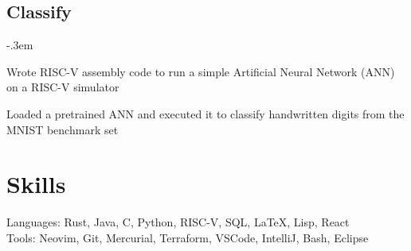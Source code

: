 \documentclass{article}
\let\olditemize=\itemize \let\endolditemize=\enditemize
\renewenvironment{itemize}{\olditemize[topsep=0em] \itemsep-.3em}{\endolditemize}
\begin{document}
\subsection{Classify}
\begin{itemize}
  \item Wrote RISC-V assembly code to run a simple Artificial Neural Network (ANN) on a RISC-V simulator
  \item Loaded a pretrained ANN and executed it to classify handwritten digits from the MNIST benchmark set
\end{itemize}




\section{Skills}
Languages:
  Rust, Java, C, Python, RISC-V, SQL, LaTeX, Lisp, React\\
Tools:
  Neovim, Git, Mercurial, Terraform, VSCode, IntelliJ, Bash, Eclipse\\
\end{document}
